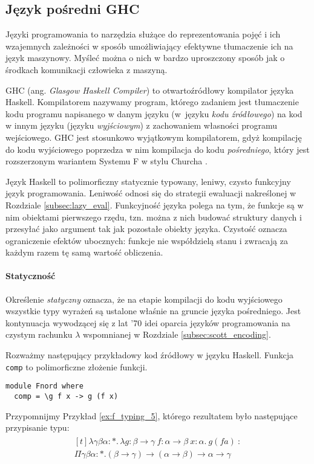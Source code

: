 \subsection{Język pośredni GHC}

Języki programowania to narzędzia służące do reprezentowania pojęć i ich wzajemnych zależności w sposób umożliwiający efektywne tłumaczenie ich na język maszynowy. Myśleć można o nich w bardzo uproszczony sposób jak o środkach komunikacji człowieka z maszyną.

GHC (ang. \emph{Glasgow Haskell Compiler}) to otwartoźródłowy kompilator języka Haskell. Kompilatorem nazywamy program, którego zadaniem jest tłumaczenie kodu programu napisanego w danym języku (w~języku \emph{kodu źródłowego}) na kod w innym języku (języku \emph{wyjściowym}) z zachowaniem własności programu wejściowego. GHC jest stosunkowo wyjątkowym kompilatorem, gdyż kompilację do kodu wyjściowego poprzedza w nim kompilacja do kodu \emph{pośredniego}, który jest rozszerzonym wariantem Systemu F w stylu Churcha \cite{Sulzmann2007}. 

Język Haskell to polimorficzny statycznie typowany, leniwy, czysto funkcyjny język programowania. Leniwość odnosi się do strategii ewaluacji nakreślonej w Rozdziale \ref{subsec:lazy_eval}. Funkcyjność języka polega na tym, że funkcje są w nim obiektami pierwszego rzędu, tzn. można z nich budować struktury danych i przesyłać jako argument tak jak pozostałe obiekty języka. Czystość oznacza ograniczenie efektów ubocznych: funkcje nie współdzielą stanu i zwracają za każdym razem tę samą wartość obliczenia. 

\paragraph{Statyczność}
Określenie \emph{statyczny} oznacza, że na etapie kompilacji do kodu wyjściowego wszystkie typy wyrażeń są ustalone właśnie na gruncie języka pośredniego. Jest kontynuacja wywodzącej się z lat '70 idei oparcia języków programowania na czystym rachunku \(\lambda\) wspomnianej w Rozdziale \ref{subsec:scott_encoding}.

Rozważmy następujący przykładowy kod źródłowy w języku Haskell. Funkcja \texttt{comp} to polimorficzne złożenie funkcji.

\begin{verbatim}
module Fnord where
  comp = \g f x -> g (f x)
\end{verbatim}

Przypomnijmy Przykład \ref{ex:f_typing_5}, którego rezultatem było następujące przypisanie typu:
\begin{align}
  \begin{aligned}[t]
\lambda \gamma \beta \alpha:*.\,\lambda g: \beta \to \gamma\  f:\alpha\to\beta\ x:\alpha.\ g(f a)\ :\\
\Pi\gamma\beta\alpha:*.(\beta\to\gamma)\to(\alpha\to\beta)\to\alpha\to\gamma
  \end{aligned}\tag{\(\blacklozenge\)}\label{ex:typing_compar}
\end{align}


